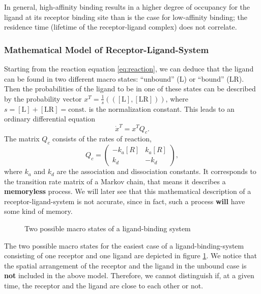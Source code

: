 In general, high-affinity binding results in a higher degree of occupancy for the ligand at its receptor binding site than is the case for low-affinity binding; the residence time (lifetime of the receptor-ligand complex) does not correlate. 

\subsubsection*{Mathematical Model of Receptor-Ligand-System}

Starting from the reaction equation \eqref{eq:reaction}, we can deduce that the ligand can be found in two different macro states: ``unbound'' (L) or ``bound'' (LR). Then the probabilities of the ligand to be in one of these states can be described by the probability vector $x^T = \frac{1}{s}((\mathrm{[L],[LR]}))$, where $s = \mathrm{[L]} + \mathrm{[LR]} = \textrm{const.}$ is the normalization constant.
This leads to an ordinary differential equation
\begin{equation*}
\dot{x}^T = x^T Q_c.
\end{equation*}
The matrix $Q_c$ consists of the rates of reaction,
\begin{equation*}
Q_c = 
\begin{pmatrix}
-k_a[R] & k_a[R]  \\
k_d      & -k_d
\end{pmatrix},
\end{equation*}
where $k_a$ and $k_d$ are the association and dissociation constants. It corresponds to the transition rate matrix of a Markov chain, that means it describes a \textbf{memoryless} process.
We will later see that this mathematical description of a receptor-ligand-system is not accurate, since in fact, such a process \textbf{will} have some kind of memory.

\begin{figure}[!ht]
	\label{fig:two_states}
	\centering
	\hspace{20pt}
	\caption{Two possible macro states of a ligand-binding system}
\end{figure}

The two possible macro states for the easiest case of a ligand-binding-system consisting of one receptor and one ligand are depicted in figure \ref{fig:two_states}. %
We notice that the spatial arrangement of the receptor and the ligand in the unbound case is \textbf{not} included in the above model.
Therefore, we cannot distinguish if, at a given time, the receptor and the ligand are close to each other or not.

